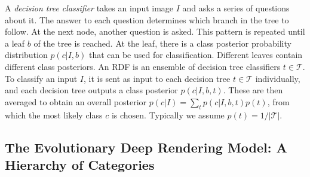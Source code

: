 \documentclass[12pt]{article}
\begin{document}
A \emph{decision tree classifier} takes an input image $I$ and asks a series of questions about it. The answer to each question determines which branch in the tree to follow. At the next node, another question is asked. This pattern is repeated until a leaf $b$ of the tree is reached. At the leaf, there is a class posterior probability distribution $p(c | I, b)$ that can be used for classification. Different leaves contain different class posteriors. 
An RDF is an ensemble of decision tree classifiers $t \in \mathcal{T}$. 
To classify an input $I$, it is sent as input to each decision tree $t \in \mathcal{T}$ individually, and each decision tree outputs a class posterior $p(c | I, b, t)$. These are then averaged to obtain an overall posterior $p(c | I) = \sum_{t} p(c | I, b, t)p(t)$, from which the most likely class $c$ is chosen. Typically we assume $p(t) = 1/|\mathcal{T}|$. 


\subsection{The Evolutionary Deep Rendering Model: A Hierarchy of Categories}
\end{document}
